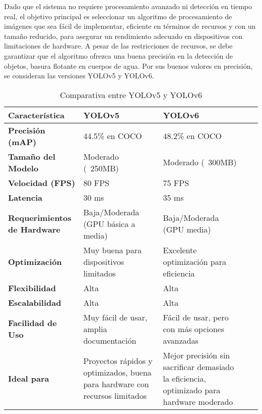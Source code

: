 Dado que el sistema no requiere procesamiento avanzado ni detección en tiempo real, el objetivo principal es seleccionar un algoritmo de procesamiento de imágenes que sea fácil de implementar, eficiente en términos de recursos y con un tamaño reducido, para asegurar un rendimiento adecuado en dispositivos con limitaciones de hardware. A pesar de las restricciones de recursos, se debe garantizar que el algoritmo ofrezca una buena precisión en la detección de objetos, basura flotante en cuerpos de agua. Por sus buenos valores en precisión, se consideran las versiones YOLOv5 y YOLOv6.

\begin{table}[H]
\centering
\renewcommand{\arraystretch}{1.5}
\caption{Comparativa entre YOLOv5 y YOLOv6}
\label{tab:yolo_comparison2}
\begin{tabular}{|p{3cm}|p{3cm}|p{3cm}|p{3cm}|p{4cm}|}
\hline
\textbf{Característica}         & \textbf{YOLOv5}                             & \textbf{YOLOv6}                             \\ \hline
\textbf{Precisión (mAP)}        & 44.5\% en COCO                              & 48.2\% en COCO                              \\ \hline
\textbf{Tamaño del Modelo}      & Moderado (~250MB)                          & Moderado (~300MB)                          \\ \hline
\textbf{Velocidad (FPS)}        & 80 FPS                   & 75 FPS                                      \\ \hline
\textbf{Latencia}               & 30 ms                                      & 35 ms                                       \\ \hline
\textbf{Requerimientos de Hardware} & Baja/Moderada (GPU básica a media)        & Baja/Moderada (GPU media)                  \\ \hline
\textbf{Optimización}           & Muy buena para dispositivos limitados      & Excelente optimización para eficiencia     \\ \hline
\textbf{Flexibilidad}           & Alta                                       & Alta                                       \\ \hline
\textbf{Escalabilidad}          & Alta                                       & Alta                                       \\ \hline
\textbf{Facilidad de Uso}       & Muy fácil de usar, amplia documentación    & Fácil de usar, pero con más opciones avanzadas \\ \hline
\textbf{Ideal para}             & Proyectos rápidos y optimizados, buena para hardware con recursos limitados & Mejor precisión sin sacrificar demasiado la eficiencia, optimizado para hardware moderado \\ \hline
\end{tabular}
\end{table}






